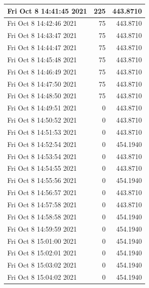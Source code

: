 \begin{longtable}{|l|r|r|}
Fri Oct  8 14:41:45 2021 &                225 &        443.8710 \\ \hline
Fri Oct  8 14:42:46 2021 &                 75 &        443.8710 \\ \hline
Fri Oct  8 14:43:47 2021 &                 75 &        443.8710 \\ \hline
Fri Oct  8 14:44:47 2021 &                 75 &        443.8710 \\ \hline
Fri Oct  8 14:45:48 2021 &                 75 &        443.8710 \\ \hline
Fri Oct  8 14:46:49 2021 &                 75 &        443.8710 \\ \hline
Fri Oct  8 14:47:50 2021 &                 75 &        443.8710 \\ \hline
Fri Oct  8 14:48:50 2021 &                 75 &        443.8710 \\ \hline
Fri Oct  8 14:49:51 2021 &                  0 &        443.8710 \\ \hline
Fri Oct  8 14:50:52 2021 &                  0 &        443.8710 \\ \hline
Fri Oct  8 14:51:53 2021 &                  0 &        443.8710 \\ \hline
Fri Oct  8 14:52:54 2021 &                  0 &        454.1940 \\ \hline
Fri Oct  8 14:53:54 2021 &                  0 &        443.8710 \\ \hline
Fri Oct  8 14:54:55 2021 &                  0 &        443.8710 \\ \hline
Fri Oct  8 14:55:56 2021 &                  0 &        454.1940 \\ \hline
Fri Oct  8 14:56:57 2021 &                  0 &        443.8710 \\ \hline
Fri Oct  8 14:57:58 2021 &                  0 &        443.8710 \\ \hline
Fri Oct  8 14:58:58 2021 &                  0 &        454.1940 \\ \hline
Fri Oct  8 14:59:59 2021 &                  0 &        454.1940 \\ \hline
Fri Oct  8 15:01:00 2021 &                  0 &        454.1940 \\ \hline
Fri Oct  8 15:02:01 2021 &                  0 &        454.1940 \\ \hline
Fri Oct  8 15:03:02 2021 &                  0 &        454.1940 \\ \hline
Fri Oct  8 15:04:02 2021 &                  0 &        454.1940 \\ \hline

\end{longtable}
